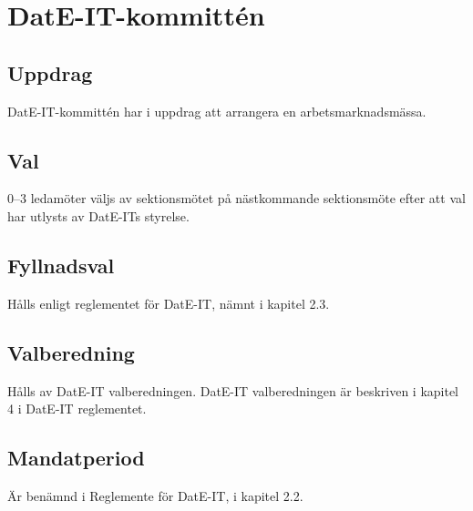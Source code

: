 \section{DatE-IT-kommittén}
\subsection{Uppdrag}
DatE-IT-kommittén har i uppdrag att arrangera en arbetsmarknadsmässa.
\subsection{Val}
0--3 ledamöter väljs av sektionsmötet på nästkommande sektionsmöte efter att val har utlysts av DatE-ITs styrelse.
\subsection{Fyllnadsval}
Hålls enligt reglementet för DatE-IT, nämnt i kapitel 2.3.
\subsection{Valberedning}
Hålls av DatE-IT valberedningen.
DatE-IT valberedningen är beskriven i kapitel 4 i DatE-IT reglementet.
\subsection{Mandatperiod}
Är benämnd i Reglemente för DatE-IT, i kapitel 2.2.

\newpage
